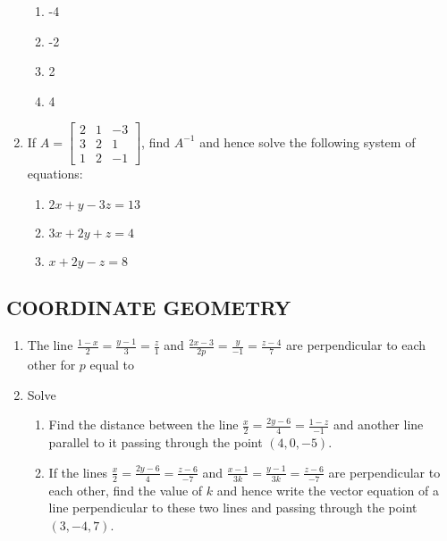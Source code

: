 \documentclass{article}
\begin{document}
\begin{enumerate}[label=\textbf{\arabic*.}]
    \begin{enumerate}[label=\alph*)] %
        \item -4
        \item -2
        \item 2
        \item 4
    \end{enumerate}

    \item If \( A = \begin{bmatrix}
    2 & 1 & -3 \\
    3 & 2 & 1 \\
    1 & 2 & -1
    \end{bmatrix} \), find \( A^{-1} \) and hence solve the following system of equations:
    
    \begin{enumerate}
        \item \(2x + y - 3z = 13\)
        \item \(3x + 2y + z = 4\)
        \item \(x + 2y - z = 8\)
    \end{enumerate}

\end{enumerate}

\subsection*{COORDINATE GEOMETRY}

\begin{enumerate}[label=\textbf{\arabic*.}] %

    \item The line \(\frac{1-x}{2} = \frac{y-1}{3} = \frac{z}{1}\) and \(\frac{2x-3}{2p} = \frac{y}{-1} = \frac{z-4}{7}\) are perpendicular to each other for \( p \) equal to

    \item Solve

    \begin{enumerate}[label=\alph*)] %
        \item Find the distance between the line \(\frac{x}{2} = \frac{2y-6}{4} = \frac{1-z}{-1}\) and another line parallel to it passing through the point \((4,0,-5)\).
        
        \item If the lines \(\frac{x}{2} = \frac{2y-6}{4} = \frac{z-6}{-7}\) and \(\frac{x-1}{3k} = \frac{y-1}{3k} = \frac{z-6}{-7}\) are perpendicular to each other, find the value of \( k \) and hence write the vector equation of a line perpendicular to these two lines and passing through the point \((3, -4, 7)\).
    \end{enumerate}

\end{enumerate}
\end{document}
